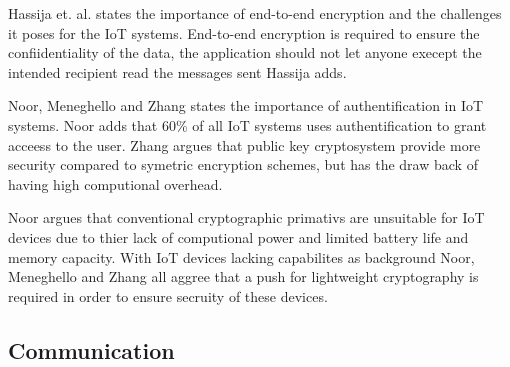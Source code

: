 Hassija et. al. states the importance of end-to-end encryption and the challenges it poses for the IoT systems. 
End-to-end encryption is required to ensure the confiidentiality of the data, the application should not let anyone execept the intended recipient read the messages sent Hassija adds.\cite{Hassija2019}

Noor, Meneghello and Zhang states the importance of authentification in IoT systems. \cite{Noor2019,Meneghello2019,Zhang2014} 
Noor adds that 60\% of all IoT systems uses authentification to grant acceess to the user.  
Zhang argues that public key cryptosystem provide more security compared to symetric encryption schemes, but has the draw back of having high computional overhead. \cite{Zhang2014} 

Noor argues that conventional cryptographic primativs are unsuitable for IoT devices due to thier lack of computional power and limited battery life and memory capacity.
With IoT devices lacking capabilites as background Noor, Meneghello and Zhang all aggree that a push for lightweight cryptography is required in order to ensure secruity of these devices. \cite{Noor2019,Meneghello2019,Zhang2014} 

\subsection{Communication} 



